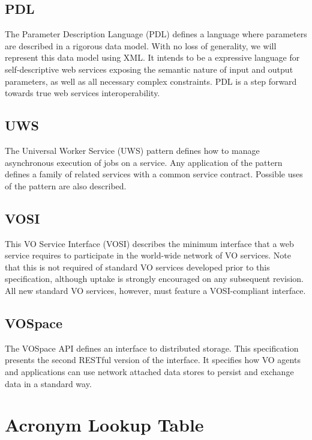 \documentclass[11pt,letter]{ivoa}
\begin{document}
{\subsection{PDL}

The Parameter Description Language (PDL) \citep{2014ivoa.spec.0523Z}
defines a language where parameters are described in a
rigorous data model. With no loss of generality, we will represent this
data model using
XML. It intends to be a expressive language for self-descriptive web
services exposing
the semantic nature of input and output parameters, as well as all
necessary complex
constraints. PDL is a step forward towards true web services
interoperability.
 
\subsection{UWS} 

The Universal Worker Service (UWS) \citep{2016ivoa.spec.1024H} pattern
defines how to manage asynchronous execution
of jobs on a service. Any application of the pattern defines a family of
related services
with a common service contract. Possible uses of the pattern are also
described.

\subsection{VOSI} 

This VO Service Interface (VOSI) \citep{2017ivoa.spec.0524G} describes
the minimum interface that a web service requires to
participate in the world-wide network of VO services. Note that this is
not required of
standard VO services developed prior to this specification, although
uptake is strongly
encouraged on any subsequent revision. All new standard VO services,
however, must feature
a VOSI-compliant interface. 

\subsection{VOSpace}

The VOSpace \citep{2018ivoa.spec.0621G} API defines an interface to
distributed storage. This specification presents the
second RESTful version of the interface. It specifies how VO agents and
applications can
use network attached data stores to persist and exchange data in a
standard way.

\pagebreak
\section{Acronym Lookup Table}

}
\end{document}
